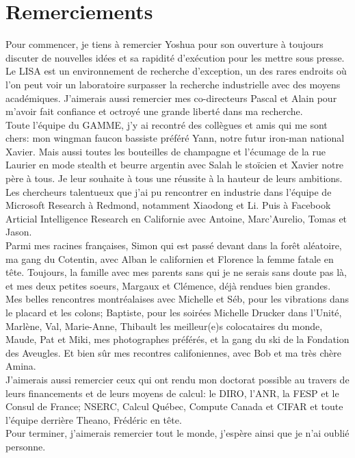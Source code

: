 \chapter*{Remerciements}
\vspace{-0.5cm}
Pour commencer, je tiens à remercier Yoshua pour son ouverture à toujours
discuter de nouvelles idées et sa rapidité d'exécution pour les mettre sous
presse. Le LISA est un environnement de recherche d'exception, un des rares
endroits où l'on peut voir un laboratoire surpasser la recherche industrielle
avec des moyens académiques. J'aimerais aussi remercier mes co-directeurs Pascal
et Alain pour m'avoir fait confiance et octroyé une grande liberté dans ma
recherche.
\\

\vspace{-0.1cm}
Toute l'équipe du GAMME, j'y ai recontré des collègues et amis qui me sont
chers: mon wingman faucon bassiste préféré Yann, notre futur iron-man national
Xavier. Mais aussi toutes les bouteilles de champagne et l'écumage de la rue
Laurier en mode stealth et beurre argentin avec Salah le stoïcien et Xavier
notre père à tous.  Je leur souhaite à tous une réussite à la hauteur de leurs
ambitions.
\\

\vspace{-0.1cm}
Les chercheurs talentueux que j'ai pu rencontrer en industrie dans l'équipe de
Microsoft Research à Redmond, notamment Xiaodong et Li. Puis à Facebook
Articial Intelligence Research en Californie avec Antoine, Marc'Aurelio, Tomas
et Jason.
\\

\vspace{-0.1cm}
Parmi mes racines françaises, Simon qui est passé devant dans la forêt
aléatoire, ma gang du Cotentin, avec Alban le californien et Florence la femme
fatale en tête. Toujours, la famille avec mes parents sans qui je ne serais sans
doute pas là, et mes deux petites soeurs, Margaux et Clémence, déjà rendues bien grandes.
\\

\vspace{-0.1cm}
Mes belles rencontres montréalaises avec Michelle et Séb, pour les vibrations
dans le placard et les colons; Baptiste, pour les soirées Michelle Drucker
dans l'Unité, Marlène, Val, Marie-Anne, Thibault les meilleur(e)s
colocataires du monde, Maude, Pat et Miki, mes photographes préférés, et la
gang du ski de la Fondation des Aveugles. Et bien sûr mes recontres
califoniennes, avec Bob et ma très chère Amina.
\\

\vspace{-0.1cm}
J'aimerais aussi remercier ceux qui ont rendu mon doctorat possible
au travers de leurs financements et de leurs moyens de calcul: le DIRO, l'ANR,
la FESP et le Consul de France; NSERC, Calcul Québec, Compute Canada et CIFAR
et toute l'équipe derrière Theano, Frédéric en tête. 
\\

\vspace{-0.1cm}
Pour terminer, j'aimerais remercier tout le monde, j'espère ainsi que je n'ai
oublié personne.
